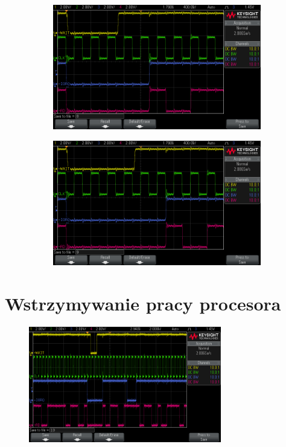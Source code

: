 \documentclass[fleqn]{article}
\begin{document}
\begin{figure}[H]
\begin{subfigure}[b]{0.49\textwidth}
		\caption{}
	\end{subfigure}
	\begin{subfigure}[b]{0.49\textwidth}
		\includegraphics[width=\textwidth]{img/2d.png}
		\caption{}
	\end{subfigure}
	\begin{subfigure}[b]{0.49\textwidth}
		\includegraphics[width=\textwidth]{img/2e.png}
		\caption{}
	\end{subfigure}
	\caption{}
\end{figure}

\section{Wstrzymywanie pracy procesora}

\begin{figure}[H]
	\centering
	\includegraphics[width=0.75\textwidth]{img/3a.png}
	\caption{}
\end{figure}
\end{document}
